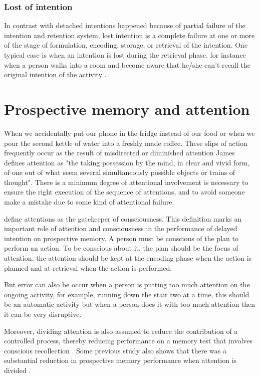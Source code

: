 \subsubsection{Lost of intention}

In contrast with detached intentions happened because of partial failure of the intention and retention system, lost intention
is a complete failure at one or more of the stage of formulation, encoding, storage, or retrieval of the intention.
One typical case is when an intention is lost during the retrieval phase. for instance when a person walks into a room and become aware that he/she can't recall the original intention of the activity \citep{Reason1984}.


\section{Prospective memory and attention}


When we accidentally put our phone in the fridge instead of our food or when we pour the second kettle of water into a freshly made coffee. These slips of action frequently occur as the result of misdirected or diminished attention \cite{Reason1984}
James defines attention as  "the taking possession by the mind, in clear and vivid form, of one out of what seem several simultaneously possible objects or trains of thought".
There is a minimum degree of attentional involvement is necessary to ensure the right execution of the sequence of attentions, and to avoid someone make a mistake due to some kind of attentional failure.

\cite{Reason1984} define attentions as the gatekeeper of consciousness. This definition marks an important role of attention and consciousness in the performance of delayed intention on prospective memory. A person must be conscious of the plan to perform an action. To be conscious about it, the plan should be the focus of attention. the attention should be kept at the encoding phase when the action is planned and at retrieval when the action is performed.

But error can also be occur when a person is putting too much attention on the ongoing activity, for example, running down the stair two at a time, this should be an automatic activity but when a person does it with too much attention then it can be very disruptive.

Moreover, dividing attention is also assumed to reduce the contribution of a controlled process, thereby
reducing performance on a memory test that involves conscious recollection \citep{Jacoby1989}.
Some previous study also shows that there was a substantial reduction in prospective memory performance when attention is divided \citep{McDaniel1998}
\citep{10.1371/journal.pone.0074447}.


